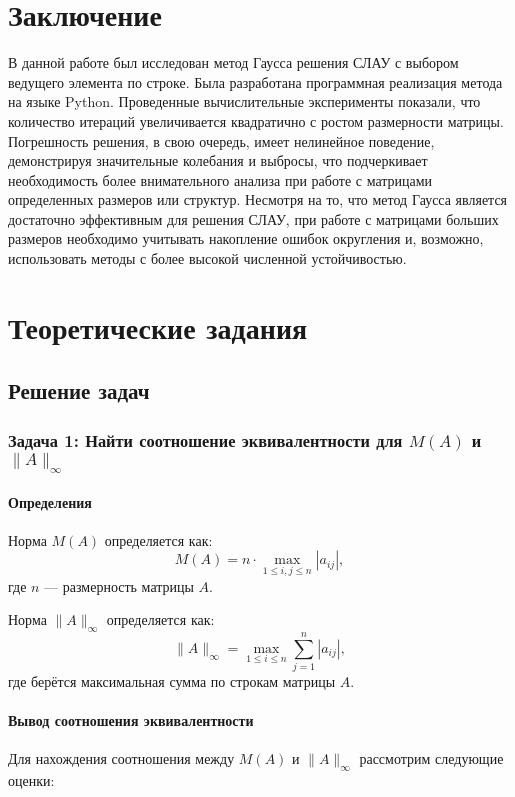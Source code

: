\chapter{Заключение}

В данной работе был исследован метод Гаусса решения СЛАУ с выбором ведущего элемента по строке. Была разработана программная реализация метода на языке Python. 
Проведенные вычислительные эксперименты показали, что количество итераций увеличивается квадратично с ростом размерности матрицы. Погрешность решения, в свою очередь, имеет нелинейное поведение, демонстрируя значительные колебания и выбросы, что подчеркивает необходимость более внимательного анализа при работе с матрицами определенных размеров или структур.
Несмотря на то, что метод Гаусса является достаточно эффективным для решения СЛАУ, при работе с матрицами больших размеров необходимо учитывать накопление ошибок округления и, возможно, использовать методы с более высокой численной устойчивостью.


\chapter{Теоретические задания}

\section*{Решение задач}

\subsection*{Задача 1: Найти соотношение эквивалентности для $M(A)$ и $\|A\|_\infty$}

\subsubsection*{Определения}
Норма $M(A)$ определяется как:
\[
M(A) = n \cdot \max_{1 \leq i, j \leq n} |a_{ij}|,
\]
где $n$ --- размерность матрицы $A$.

Норма $\|A\|_\infty$ определяется как:
\[
\|A\|_\infty = \max_{1 \leq i \leq n} \sum_{j=1}^n |a_{ij}|,
\]
где берётся максимальная сумма по строкам матрицы $A$.

\subsubsection*{Вывод соотношения эквивалентности}
Для нахождения соотношения между $M(A)$ и $\|A\|_\infty$ рассмотрим следующие оценки:

